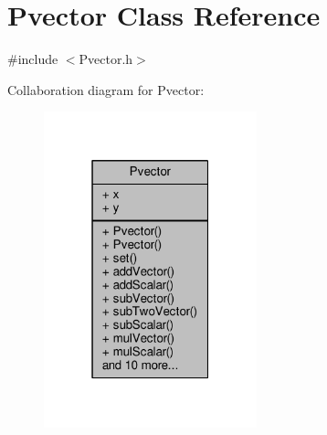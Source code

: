 \hypertarget{class_pvector}{}\section{Pvector Class Reference}
\label{class_pvector}


{\ttfamily \#include $<$Pvector.\+h$>$}



Collaboration diagram for Pvector\+:
\nopagebreak
\begin{figure}[H]
\begin{center}
\leavevmode
\includegraphics[width=175pt]{class_pvector__coll__graph}
\end{center}
\end{figure}

